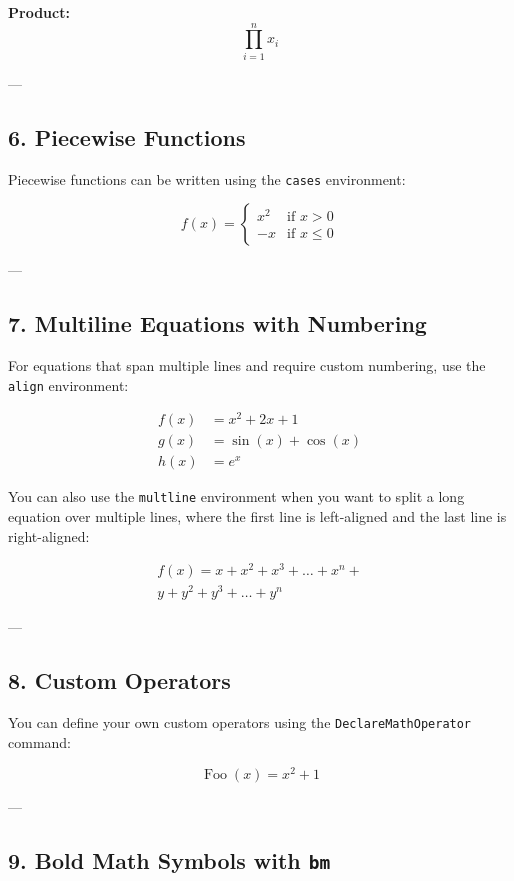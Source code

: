 \documentclass{article}
\begin{document}
\textbf{Product:}
\[
\prod_{i=1}^{n} x_i
\]

---

\subsection*{6. Piecewise Functions}

Piecewise functions can be written using the \texttt{cases} environment:

\[
f(x) =
\begin{cases}
    x^2 & \text{if } x > 0 \\
    -x & \text{if } x \leq 0
\end{cases}
\]

---

\subsection*{7. Multiline Equations with Numbering}

For equations that span multiple lines and require custom numbering, use the \texttt{align} environment:

\begin{align}
    f(x) &= x^2 + 2x + 1 \tag{1} \\
    g(x) &= \sin(x) + \cos(x) \tag{2} \\
    h(x) &= e^x \tag{3}
\end{align}

You can also use the \texttt{multline} environment when you want to split a long equation over multiple lines, where the first line is left-aligned and the last line is right-aligned:

\begin{multline}
    f(x) = x + x^2 + x^3 + \dots + x^n + \\
    y + y^2 + y^3 + \dots + y^n
\end{multline}

---

\subsection*{8. Custom Operators}

You can define your own custom operators using the \texttt{DeclareMathOperator} command:

\DeclareMathOperator{\foo}{Foo}
\[
\foo(x) = x^2 + 1
\]

---

\subsection*{9. Bold Math Symbols with \texttt{bm}}
\end{document}
